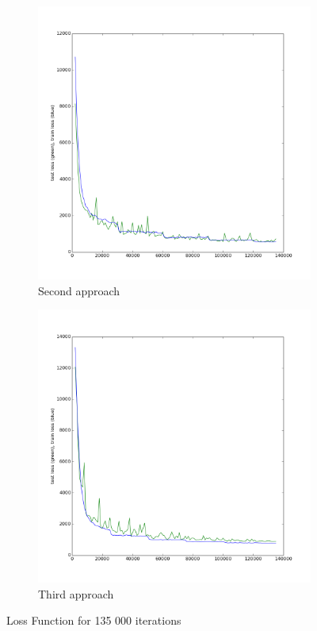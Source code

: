 \begin{figure}[!h]
\begin{subfigure}{0.33\textwidth}
\includegraphics[width=0.9\linewidth]{images/regression/test_loss_37_135000.png}
\caption{Second approach}
\end{subfigure}%
\begin{subfigure}{0.33\textwidth}
\label{3apploss}
\centering
\includegraphics[width=0.9\linewidth]{images/regression/test_loss_30_135000.png}
\caption{Third approach}
\end{subfigure}
\caption{Loss Function for 135 000 iterations}
\end{figure}

